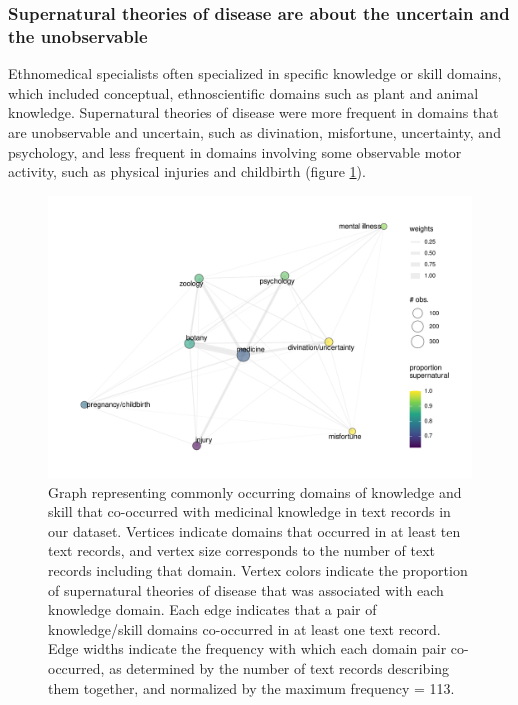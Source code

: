 \documentclass[
  11pt,
]{article}
\begin{document}
\hypertarget{supernatural-theories-of-disease-are-about-the-uncertain-and-the-unobservable}{%
\subsubsection{Supernatural theories of disease are about the uncertain and the unobservable}\label{supernatural-theories-of-disease-are-about-the-uncertain-and-the-unobservable}}

Ethnomedical specialists often specialized in specific knowledge or skill domains, which included conceptual, ethnoscientific domains such as plant and animal knowledge. Supernatural theories of disease were more frequent in domains that are unobservable and uncertain, such as divination, misfortune, uncertainty, and psychology, and less frequent in domains involving some observable motor activity, such as physical injuries and childbirth (figure \ref{fig:ehrafdomainSupernaturalPlot}).

\begin{figure}[p]

{\centering \includegraphics{magic-healers-article2_files/figure-latex/ehrafdomainSupernaturalPlot-1} 

}

\caption{Graph representing commonly occurring domains of knowledge and skill that co-occurred with medicinal knowledge in text records in our dataset. Vertices indicate domains that occurred in at least ten text records, and vertex size corresponds to the number of text records including that domain. Vertex colors indicate the proportion of supernatural theories of disease that was associated with each knowledge domain. Each edge indicates that a pair of knowledge/skill domains co-occurred in at least one text record. Edge widths indicate the frequency with which each domain pair co-occurred, as determined by the number of text records describing them together, and normalized by the maximum frequency = 113.}\label{fig:ehrafdomainSupernaturalPlot}
\end{figure}
\end{document}
